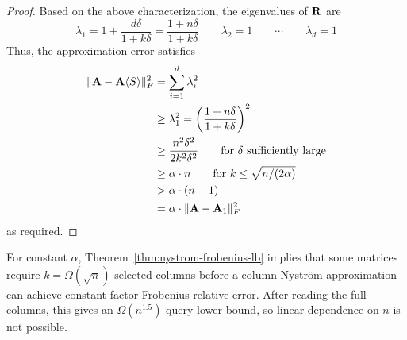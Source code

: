 \begin{proof}
Based on the above characterization, the eigenvalues of $\mathbf{R}$ are
\[\lambda_1 = 1+\frac{d\delta}{1+k\delta} = \frac{1 + n\delta}{1 + k\delta}\qquad\lambda_2 = 1\qquad\cdots\qquad\lambda_d = 1\]
Thus, the approximation error satisfies
\begin{align*}
    \|\mathbf{A} - \mathbf{A}\langle S\rangle\|^2_F &= \sum_{i=1}^d \lambda_i^2\\
    &\geq \lambda_1^2 = \left(\frac{1+n\delta}{1+k\delta}\right)^2\\
    &\geq \frac{n^2\delta^2}{2 k^2\delta^2}\qquad\text{for $\delta$ sufficiently large}\\
    &\geq \alpha\cdot n\qquad\text{for $k \leq \sqrt{n/(2\alpha)}$}\\
    & > \alpha\cdot(n-1) \\
    &= \alpha\cdot \|\mathbf{A}-\mathbf{A}_1\|^2_F
\end{align*}
as required.
\end{proof}

For constant $\alpha$, Theorem~\ref{thm:nystrom-frobenius-lb} implies that some matrices require $k=\Omega(\sqrt n)$ selected columns before a column Nystr\"om approximation can achieve constant-factor Frobenius relative error. After reading the full columns, this gives an $\Omega(n^{1.5})$ query lower bound, so linear dependence on $n$ is not possible. 
